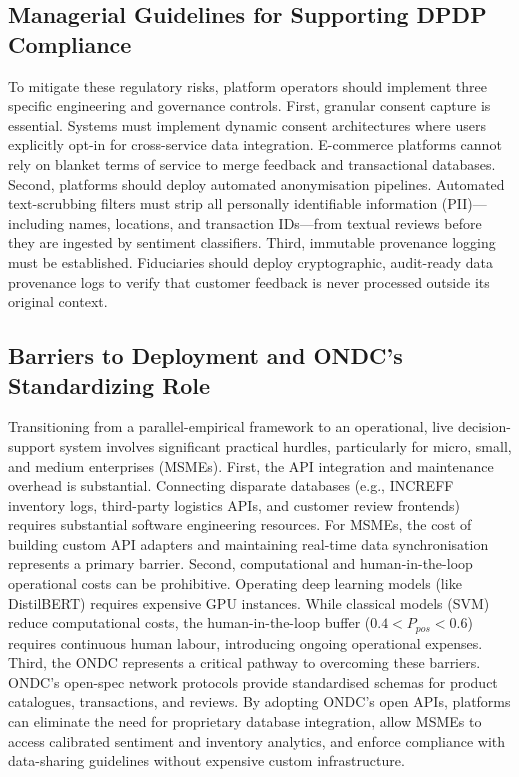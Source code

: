\documentclass[authoryear,review,3p,times,12pt]{elsarticle}
\begin{document}
\subsection{Managerial Guidelines for Supporting DPDP Compliance}
\label{sec:managerial_guidelines}
To mitigate these regulatory risks, platform operators should implement three specific engineering and governance controls. First, granular consent capture is essential. Systems must implement dynamic consent architectures where users explicitly opt-in for cross-service data integration. E-commerce platforms cannot rely on blanket terms of service to merge feedback and transactional databases. Second, platforms should deploy automated anonymisation pipelines. Automated text-scrubbing filters must strip all personally identifiable information (PII)—including names, locations, and transaction IDs—from textual reviews before they are ingested by sentiment classifiers. Third, immutable provenance logging must be established. Fiduciaries should deploy cryptographic, audit-ready data provenance logs to verify that customer feedback is never processed outside its original context.

\subsection{Barriers to Deployment and ONDC's Standardizing Role}
Transitioning from a parallel-empirical framework to an operational, live decision-support system involves significant practical hurdles, particularly for micro, small, and medium enterprises (MSMEs). First, the API integration and maintenance overhead is substantial. Connecting disparate databases (e.g., INCREFF inventory logs, third-party logistics APIs, and customer review frontends) requires substantial software engineering resources. For MSMEs, the cost of building custom API adapters and maintaining real-time data synchronisation represents a primary barrier. Second, computational and human-in-the-loop operational costs can be prohibitive. Operating deep learning models (like DistilBERT) requires expensive GPU instances. While classical models (SVM) reduce computational costs, the human-in-the-loop buffer ($0.4 < P_{pos} < 0.6$) requires continuous human labour, introducing ongoing operational expenses. Third, the ONDC represents a critical pathway to overcoming these barriers. ONDC's open-spec network protocols provide standardised schemas for product catalogues, transactions, and reviews. By adopting ONDC's open APIs, platforms can eliminate the need for proprietary database integration, allow MSMEs to access calibrated sentiment and inventory analytics, and enforce compliance with data-sharing guidelines without expensive custom infrastructure.
\end{document}
